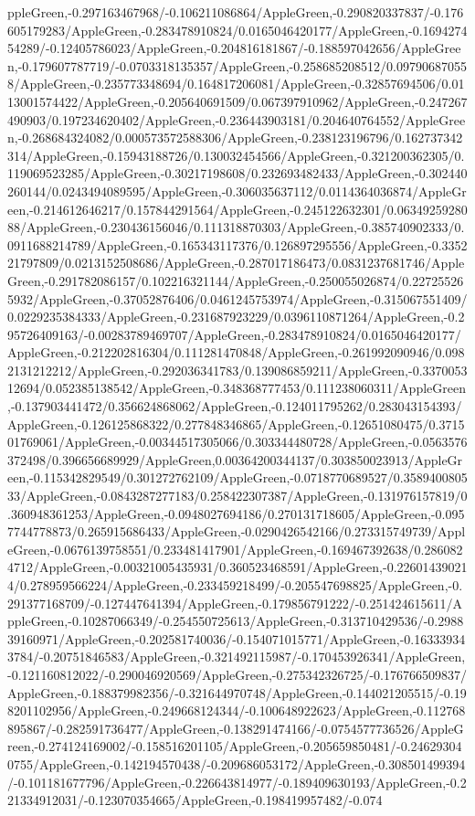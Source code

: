 {\begin{tikzternal}
{ppleGreen,-0.297163467968/-0.106211086864/AppleGreen,-0.290820337837/-0.176605179283/AppleGreen,-0.283478910824/0.0165046420177/AppleGreen,-0.169427454289/-0.12405786023/AppleGreen,-0.204816181867/-0.188597042656/AppleGreen,-0.179607787719/-0.0703318135357/AppleGreen,-0.258685208512/0.097906870558/AppleGreen,-0.235773348694/0.164817206081/AppleGreen,-0.32857694506/0.0113001574422/AppleGreen,-0.205640691509/0.067397910962/AppleGreen,-0.247267490903/0.197234620402/AppleGreen,-0.236443903181/0.204640764552/AppleGreen,-0.268684324082/0.000573572588306/AppleGreen,-0.238123196796/0.162737342314/AppleGreen,-0.15943188726/0.130032454566/AppleGreen,-0.321200362305/0.119069523285/AppleGreen,-0.30217198608/0.232693482433/AppleGreen,-0.302440260144/0.0243494089595/AppleGreen,-0.306035637112/0.0114364036874/AppleGreen,-0.214612646217/0.157844291564/AppleGreen,-0.245122632301/0.0634925928088/AppleGreen,-0.230436156046/0.111318870303/AppleGreen,-0.385740902333/0.0911688214789/AppleGreen,-0.165343117376/0.126897295556/AppleGreen,-0.335221797809/0.0213152508686/AppleGreen,-0.287017186473/0.0831237681746/AppleGreen,-0.291782086157/0.102216321144/AppleGreen,-0.250055026874/0.227255265932/AppleGreen,-0.37052876406/0.0461245753974/AppleGreen,-0.315067551409/0.0229235384333/AppleGreen,-0.231687923229/0.0396110871264/AppleGreen,-0.295726409163/-0.00283789469707/AppleGreen,-0.283478910824/0.0165046420177/AppleGreen,-0.212202816304/0.111281470848/AppleGreen,-0.261992090946/0.0982131212212/AppleGreen,-0.292036341783/0.139086859211/AppleGreen,-0.337005312694/0.052385138542/AppleGreen,-0.348368777453/0.111238060311/AppleGreen,-0.137903441472/0.356624868062/AppleGreen,-0.124011795262/0.283043154393/AppleGreen,-0.126125868322/0.277848346865/AppleGreen,-0.12651080475/0.371501769061/AppleGreen,-0.00344517305066/0.303344480728/AppleGreen,-0.0563576372498/0.396656689929/AppleGreen,0.00364200344137/0.303850023913/AppleGreen,-0.115342829549/0.301272762109/AppleGreen,-0.0718770689527/0.358940080533/AppleGreen,-0.0843287277183/0.258422307387/AppleGreen,-0.131976157819/0.360948361253/AppleGreen,-0.0948027694186/0.270131718605/AppleGreen,-0.0957744778873/0.265915686433/AppleGreen,-0.0290426542166/0.273315749739/AppleGreen,-0.0676139758551/0.233481417901/AppleGreen,-0.169467392638/0.2860824712/AppleGreen,-0.00321005435931/0.360523468591/AppleGreen,-0.226014390214/0.278959566224/AppleGreen,-0.233459218499/-0.205547698825/AppleGreen,-0.291377168709/-0.127447641394/AppleGreen,-0.179856791222/-0.251424615611/AppleGreen,-0.10287066349/-0.254550725613/AppleGreen,-0.313710429536/-0.298839160971/AppleGreen,-0.202581740036/-0.154071015771/AppleGreen,-0.163339343784/-0.20751846583/AppleGreen,-0.321492115987/-0.170453926341/AppleGreen,-0.121160812022/-0.290046920569/AppleGreen,-0.275342326725/-0.176766509837/AppleGreen,-0.188379982356/-0.321644970748/AppleGreen,-0.144021205515/-0.198201102956/AppleGreen,-0.249668124344/-0.100648922623/AppleGreen,-0.112768895867/-0.282591736477/AppleGreen,-0.138291474166/-0.0754577736526/AppleGreen,-0.274124169002/-0.158516201105/AppleGreen,-0.205659850481/-0.246293040755/AppleGreen,-0.142194570438/-0.209686053172/AppleGreen,-0.308501499394/-0.101181677796/AppleGreen,-0.226643814977/-0.189409630193/AppleGreen,-0.221334912031/-0.123070354665/AppleGreen,-0.198419957482/-0.074}
\end{tikzternal}}

